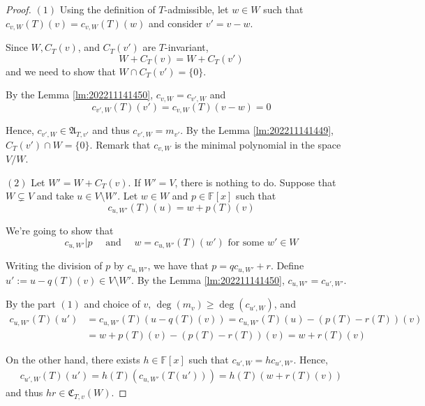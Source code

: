 \begin{proof}
  $(1)$ Using the definition of $T$-admissible, let $w \in W$ such that $c_{v,W}(T)(v) = c_{v,W}(T)(w)$ and consider $v' = v-w$. 

  Since $W, C_T(v)$, and $C_T(v')$ are $T$-invariant,
  \[
    W + C_T(v) = W + C_T(v')
  \]
  and we need to show that $W \cap C_T(v') = \{ 0 \}$.

  By the Lemma \ref{lm:202211141450}, $c_{v,W} = c_{v',W}$ and 
  \[
    c_{v',W}(T)(v') = c_{v,W}(T)(v-w) = 0
  \]
  
  Hence, $c_{v',W} \in \mathfrak{A}_{T,v'}$ and thus $c_{v', W} = m_{v'}$. By the Lemma \ref{lm:202211141449}, $C_T(v') \cap W = \{ 0 \}$. Remark that $c_{v,W}$ is the minimal polynomial in the space $V/W$.

  $(2)$ Let $W' = W + C_T(v)$. If $W' = V$, there is nothing to do. Suppose that $W \subsetneq V$ and take $u \in V \setminus W'$. Let $w \in W$ and $p \in \mathbb{F}[x]$ such that 
  \[
    c_{u, W'}(T)(u) = w + p(T)(v)
  \]
  
  We're going to show that 
  \begin{equation}\label{eq:202211170928}
    c_{u, W'} | p \quad \text{ and } \quad w = c_{u,W'}(T)(w') \text{ for some } w' \in W
  \end{equation}

  Writing the division of $p$ by $c_{u, W'}$, we have that $p = qc_{u,W'} + r$. Define $u' := u - q(T)(v) \in V \setminus W'$. By the Lemma \ref{lm:202211141450}, $c_{u, W'} = c_{u',W'}$.   

  By the part $(1)$ and choice of $v$, $\deg(m_v) \geq \deg(c_{u',W})$, and
  \begin{equation*}
  \begin{aligned}
  	c_{u, W'}(T)(u') &= c_{u, W'}(T)(u - q(T)(v)) = c_{u, W'}(T)(u) - (p(T) - r(T))(v) \\
	&= w + p(T)(v) - (p(T) - r(T))(v) = w + r(T)(v)
  \end{aligned}
  \end{equation*}
  
  On the other hand, there exists $h \in \mathbb{F}[x]$ such that $c_{u', W} = h c_{u', W'}$. Hence,
  \begin{equation*}
  \begin{aligned}
	  c_{u',W}(T)(u') = h(T)(c_{u,W'} (T(u'))) = h(T)(w + r(T)(v))
  \end{aligned}
  \end{equation*}
  and thus $hr \in \mathfrak{C}_{T,v}(W)$.
  

\end{proof}
